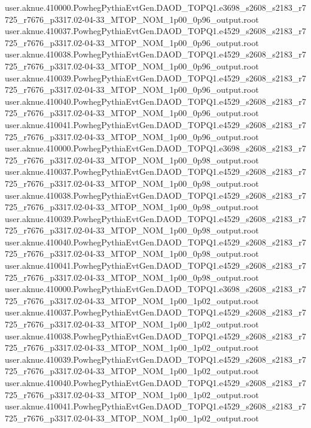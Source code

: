 {user.aknue.410000.PowhegPythiaEvtGen.DAOD_TOPQ1.e3698_s2608_s2183_r7725_r7676_p3317.02-04-33_MTOP_NOM_1p00_0p96_output.root\\
user.aknue.410037.PowhegPythiaEvtGen.DAOD_TOPQ1.e4529_s2608_s2183_r7725_r7676_p3317.02-04-33_MTOP_NOM_1p00_0p96_output.root\\
user.aknue.410038.PowhegPythiaEvtGen.DAOD_TOPQ1.e4529_s2608_s2183_r7725_r7676_p3317.02-04-33_MTOP_NOM_1p00_0p96_output.root\\
user.aknue.410039.PowhegPythiaEvtGen.DAOD_TOPQ1.e4529_s2608_s2183_r7725_r7676_p3317.02-04-33_MTOP_NOM_1p00_0p96_output.root\\
user.aknue.410040.PowhegPythiaEvtGen.DAOD_TOPQ1.e4529_s2608_s2183_r7725_r7676_p3317.02-04-33_MTOP_NOM_1p00_0p96_output.root\\
user.aknue.410041.PowhegPythiaEvtGen.DAOD_TOPQ1.e4529_s2608_s2183_r7725_r7676_p3317.02-04-33_MTOP_NOM_1p00_0p96_output.root\\

user.aknue.410000.PowhegPythiaEvtGen.DAOD_TOPQ1.e3698_s2608_s2183_r7725_r7676_p3317.02-04-33_MTOP_NOM_1p00_0p98_output.root\\
user.aknue.410037.PowhegPythiaEvtGen.DAOD_TOPQ1.e4529_s2608_s2183_r7725_r7676_p3317.02-04-33_MTOP_NOM_1p00_0p98_output.root\\
user.aknue.410038.PowhegPythiaEvtGen.DAOD_TOPQ1.e4529_s2608_s2183_r7725_r7676_p3317.02-04-33_MTOP_NOM_1p00_0p98_output.root\\
user.aknue.410039.PowhegPythiaEvtGen.DAOD_TOPQ1.e4529_s2608_s2183_r7725_r7676_p3317.02-04-33_MTOP_NOM_1p00_0p98_output.root\\
user.aknue.410040.PowhegPythiaEvtGen.DAOD_TOPQ1.e4529_s2608_s2183_r7725_r7676_p3317.02-04-33_MTOP_NOM_1p00_0p98_output.root\\
user.aknue.410041.PowhegPythiaEvtGen.DAOD_TOPQ1.e4529_s2608_s2183_r7725_r7676_p3317.02-04-33_MTOP_NOM_1p00_0p98_output.root\\

user.aknue.410000.PowhegPythiaEvtGen.DAOD_TOPQ1.e3698_s2608_s2183_r7725_r7676_p3317.02-04-33_MTOP_NOM_1p00_1p02_output.root\\
user.aknue.410037.PowhegPythiaEvtGen.DAOD_TOPQ1.e4529_s2608_s2183_r7725_r7676_p3317.02-04-33_MTOP_NOM_1p00_1p02_output.root\\
user.aknue.410038.PowhegPythiaEvtGen.DAOD_TOPQ1.e4529_s2608_s2183_r7725_r7676_p3317.02-04-33_MTOP_NOM_1p00_1p02_output.root\\
user.aknue.410039.PowhegPythiaEvtGen.DAOD_TOPQ1.e4529_s2608_s2183_r7725_r7676_p3317.02-04-33_MTOP_NOM_1p00_1p02_output.root\\
user.aknue.410040.PowhegPythiaEvtGen.DAOD_TOPQ1.e4529_s2608_s2183_r7725_r7676_p3317.02-04-33_MTOP_NOM_1p00_1p02_output.root\\
user.aknue.410041.PowhegPythiaEvtGen.DAOD_TOPQ1.e4529_s2608_s2183_r7725_r7676_p3317.02-04-33_MTOP_NOM_1p00_1p02_output.root\\

}
